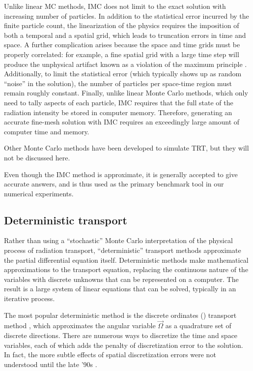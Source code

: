 Unlike linear MC methods, IMC does not limit to the exact solution with
increasing number of particles. In addition to the statistical error incurred
by the finite particle count, the linearization of the physics requires
the imposition of both a temporal and a spatial grid, which leads to
truncation errors in time and space. A further complication 
arises because the space and time grids must be properly correlated: for
example, a fine spatial grid with a large time step will produce the unphysical
artifact known as a violation of the maximum principle \cite{Lar1987}.
Additionally, to limit the statistical error (which typically shows up as
random ``noise'' in the solution), the number of particles per
space-time region must remain roughly constant. Finally, unlike linear Monte
Carlo methods, which only need to tally aspects of each particle, IMC requires
that the full state of the radiation intensity be stored in computer memory.
Therefore, generating an accurate fine-mesh solution with IMC requires an
exceedingly large
amount of computer time and memory.

Other Monte Carlo methods \cite{Bro1989,NKa1991,Cha2007a,
Den2004}
have been developed to simulate TRT, but they will not be discussed here.

Even though the IMC method is approximate, it is generally accepted to give
accurate answers, and is thus used as the primary benchmark tool in
our numerical experiments. 

\subsection{Deterministic transport}
Rather than using a ``stochastic'' Monte Carlo interpretation of the physical
process of radiation transport, ``deterministic'' transport methods
approximate the partial differential equation
itself. Deterministic methods make mathematical approximations to the transport
equation, replacing the continuous nature of the variables with discrete
unknowns that can be represented on a computer. The result is a large system of
linear equations that can be solved, typically in an iterative process.

The most popular deterministic method is the discrete ordinates (\SN)
transport method \cite{Lar2010}, which approximates the angular variable
$\vec{\Omega}$ as a quadrature set of discrete directions. There are numerous
ways to discretize the time and space variables, each of which adds the penalty
of discretization error to the solution. In fact, the more subtle effects of
spatial discretization errors were not understood until the late '90s
\cite{Ada1998,Ada2001}.

